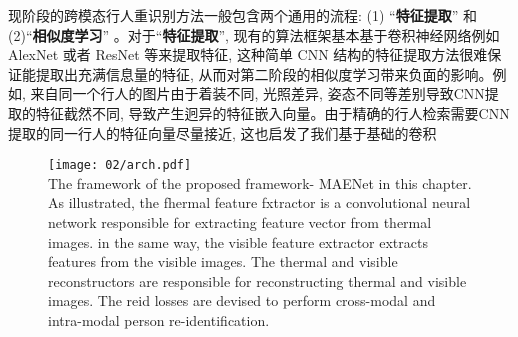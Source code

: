 现阶段的跨模态行人重识别方法一般包含两个通用的流程: (1) ``\textbf{特征提取}'' 和 (2)``\textbf{相似度学习}'' 。对于``\textbf{特征提取}'', 现有的算法框架基本基于卷积神经网络例如 AlexNet 或者 ResNet 等来提取特征, 这种简单 CNN 结构的特征提取方法很难保证能提取出充满信息量的特征, 从而对第二阶段的相似度学习带来负面的影响。例如, 来自同一个行人的图片由于着装不同, 光照差异, 姿态不同等差别导致CNN提取的特征截然不同, 导致产生迥异的特征嵌入向量。由于精确的行人检索需要CNN提取的同一行人的特征向量尽量接近, 这也启发了我们基于基础的卷积
\begin{figure}[!htp]
    \centering
    \texttt{[image: 02/arch.pdf]} \\
      {The framework of the proposed framework- MAENet in this chapter. As illustrated, the fhermal feature fxtractor is a convolutional neural network responsible for extracting feature vector from thermal images. in the same way, the visible feature extractor extracts features from the visible images. The thermal and visible reconstructors are responsible for reconstructing thermal and visible images. The reid losses are devised to perform cross-modal and intra-modal person re-identification.}   
      \label{fig:arch}
\end{figure} 

